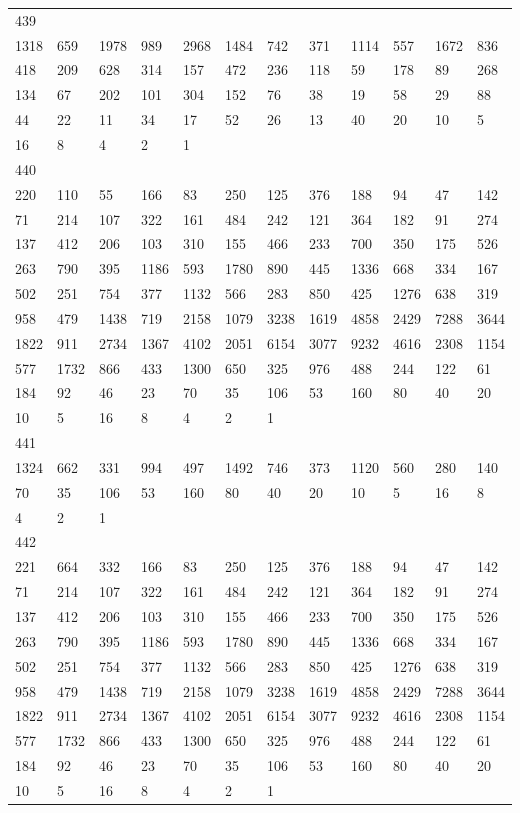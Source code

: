 \begin{longtable}{llllllllllll}
439&&&&&&&&&&&\\
1318& 659& 1978& 989& 2968& 1484& 742& 371& 1114& 557& 1672& 836\\
418& 209& 628& 314& 157& 472& 236& 118& 59& 178& 89& 268\\
134& 67& 202& 101& 304& 152& 76& 38& 19& 58& 29& 88\\
44& 22& 11& 34& 17& 52& 26& 13& 40& 20& 10& 5\\
16& 8& 4& 2& 1& \\

440&&&&&&&&&&&\\
220& 110& 55& 166& 83& 250& 125& 376& 188& 94& 47& 142\\
71& 214& 107& 322& 161& 484& 242& 121& 364& 182& 91& 274\\
137& 412& 206& 103& 310& 155& 466& 233& 700& 350& 175& 526\\
263& 790& 395& 1186& 593& 1780& 890& 445& 1336& 668& 334& 167\\
502& 251& 754& 377& 1132& 566& 283& 850& 425& 1276& 638& 319\\
958& 479& 1438& 719& 2158& 1079& 3238& 1619& 4858& 2429& 7288& 3644\\
1822& 911& 2734& 1367& 4102& 2051& 6154& 3077& 9232& 4616& 2308& 1154\\
577& 1732& 866& 433& 1300& 650& 325& 976& 488& 244& 122& 61\\
184& 92& 46& 23& 70& 35& 106& 53& 160& 80& 40& 20\\
10& 5& 16& 8& 4& 2& 1& \\

441&&&&&&&&&&&\\
1324& 662& 331& 994& 497& 1492& 746& 373& 1120& 560& 280& 140\\
70& 35& 106& 53& 160& 80& 40& 20& 10& 5& 16& 8\\
4& 2& 1& \\

442&&&&&&&&&&&\\
221& 664& 332& 166& 83& 250& 125& 376& 188& 94& 47& 142\\
71& 214& 107& 322& 161& 484& 242& 121& 364& 182& 91& 274\\
137& 412& 206& 103& 310& 155& 466& 233& 700& 350& 175& 526\\
263& 790& 395& 1186& 593& 1780& 890& 445& 1336& 668& 334& 167\\
502& 251& 754& 377& 1132& 566& 283& 850& 425& 1276& 638& 319\\
958& 479& 1438& 719& 2158& 1079& 3238& 1619& 4858& 2429& 7288& 3644\\
1822& 911& 2734& 1367& 4102& 2051& 6154& 3077& 9232& 4616& 2308& 1154\\
577& 1732& 866& 433& 1300& 650& 325& 976& 488& 244& 122& 61\\
184& 92& 46& 23& 70& 35& 106& 53& 160& 80& 40& 20\\
10& 5& 16& 8& 4& 2& 1& \\


\end{longtable}
